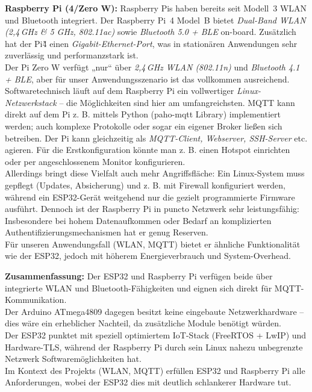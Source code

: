 \noindent\textbf{Raspberry Pi (4/Zero W):} Raspberry Pis haben bereits seit Modell~3 WLAN und Bluetooth integriert. Der Raspberry Pi~4 Model~B bietet \textit{Dual-Band WLAN (2{,}4\,GHz \& 5 GHz, 802.11ac)} sowie \textit{Bluetooth 5.0 + BLE} on-board. \autocite{raspberry_pi_datasheet} Zusätzlich hat der Pi\~4 einen \textit{Gigabit-Ethernet-Port}, \autocite{raspberry_pi_datasheet}  was in stationären Anwendungen sehr zuverlässig und performanzstark ist.
\\
Der Pi Zero W verfügt „nur“ über \textit{2{,}4\,GHz WLAN (802.11n)} und \textit{Bluetooth 4.1 + BLE}, \autocite{raspberry_pi_w_datasheet}  aber für unser Anwendungsszenario ist das vollkommen ausreichend. 
\\
Softwaretechnisch läuft auf dem Raspberry Pi ein vollwertiger \textit{Linux-Netzwerkstack} – die Möglichkeiten sind hier am umfangreichsten. MQTT kann direkt auf dem Pi z. B. mittels Python (paho-mqtt Library) implementiert werden; auch komplexe Protokolle oder sogar ein eigener Broker ließen sich betreiben. Der Pi kann gleichzeitig als \textit{MQTT-Client, Webserver, SSH-Server} etc. agieren. Für die Erstkonfiguration könnte man z. B. einen Hotspot einrichten oder per angeschlossenem Monitor konfigurieren. 
\\
Allerdings bringt diese Vielfalt auch mehr Angriffsfläche: Ein Linux-System muss gepflegt (Updates, Absicherung) und z. B. mit Firewall konfiguriert werden, während ein ESP32-Gerät weitgehend nur die gezielt programmierte Firmware ausführt. Dennoch ist der Raspberry Pi in puncto Netzwerk sehr leistungsfähig: Insbesondere bei hohem Datenaufkommen oder Bedarf an komplizierten Authentifizierungsmechanismen hat er genug Reserven. 
\\
Für unseren Anwendungsfall (WLAN, MQTT) bietet er ähnliche Funktionalität wie der ESP32, jedoch mit höherem Energieverbrauch und System-Overhead.


\vspace{5mm}

\noindent\textbf{Zusammenfassung:} Der ESP32 und Raspberry Pi verfügen beide über integrierte WLAN und Bluetooth-Fähigkeiten und eignen sich direkt für MQTT-Kommunikation. 
\\
Der Arduino ATmega4809 dagegen besitzt keine eingebaute Netzwerkhardware – dies wäre ein erheblicher Nachteil, da zusätzliche Module benötigt würden. 
\\
Der ESP32 punktet mit speziell optimiertem IoT-Stack (FreeRTOS + LwIP) und Hardware-TLS, während der Raspberry Pi durch sein Linux nahezu unbegrenzte Netzwerk Softwaremöglichkeiten hat. 
\\
Im Kontext des Projekts (WLAN, MQTT) erfüllen ESP32 und Raspberry Pi alle Anforderungen, wobei der ESP32 dies mit deutlich schlankerer Hardware tut.

